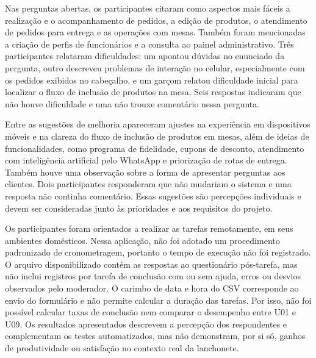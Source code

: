 Nas perguntas abertas, os participantes citaram como aspectos mais fáceis a realização e o acompanhamento de pedidos, a edição de produtos, o atendimento de pedidos para entrega e as operações com mesas. Também foram mencionadas a criação de perfis de funcionários e a consulta ao painel administrativo. Três participantes relataram dificuldades: um apontou dúvidas no enunciado da pergunta, outro descreveu problemas de interação no celular, especialmente com os pedidos exibidos no cabeçalho, e um garçom relatou dificuldade inicial para localizar o fluxo de inclusão de produtos na mesa. Seis respostas indicaram que não houve dificuldade e uma não trouxe comentário nessa pergunta.

Entre as sugestões de melhoria apareceram ajustes na experiência em dispositivos móveis e na clareza do fluxo de inclusão de produtos em mesas, além de ideias de funcionalidades, como programa de fidelidade, cupons de desconto, atendimento com inteligência artificial pelo WhatsApp e priorização de rotas de entrega. Também houve uma observação sobre a forma de apresentar perguntas aos clientes. Dois participantes responderam que não mudariam o sistema e uma resposta não continha comentário. Essas sugestões são percepções individuais e devem ser consideradas junto às prioridades e aos requisitos do projeto.

Os participantes foram orientados a realizar as tarefas remotamente, em seus ambientes domésticos. Nessa aplicação, não foi adotado um procedimento padronizado de cronometragem, portanto o tempo de execução não foi registrado. O arquivo disponibilizado contém as respostas ao questionário pós-tarefa, mas não inclui registros por tarefa de conclusão com ou sem ajuda, erros ou desvios observados pelo moderador. O carimbo de data e hora do CSV corresponde ao envio do formulário e não permite calcular a duração das tarefas. Por isso, não foi possível calcular taxas de conclusão nem comparar o desempenho entre U01 e U09. Os resultados apresentados descrevem a percepção dos respondentes e complementam os testes automatizados, mas não demonstram, por si só, ganhos de produtividade ou satisfação no contexto real da lanchonete.
